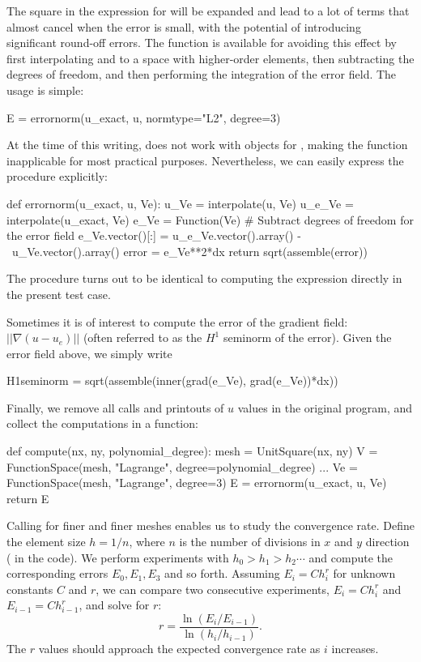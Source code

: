The square in the expression for  will be expanded and lead
to a lot of terms that almost cancel when the error is small, with the
potential of introducing significant round-off errors.  The function
 is available for avoiding this effect by first
interpolating  and  to a space with higher-order
elements, then subtracting the degrees of freedom, and then performing
the integration of the error field. The usage is simple:
\begin{python}
  E = errornorm(u_exact, u, normtype="L2", degree=3)
\end{python}
At the time of this writing,  does not work with
 objects for , making the function
inapplicable for most practical purposes. Nevertheless, we can easily
express the procedure explicitly:
\begin{python}
def errornorm(u_exact, u, Ve):
    u_Ve = interpolate(u, Ve)
    u_e_Ve = interpolate(u_exact, Ve)
    e_Ve = Function(Ve)
    # Subtract degrees of freedom for the error field
    e_Ve.vector()[:] = u_e_Ve.vector().array() - \
                       u_Ve.vector().array()
    error = e_Ve**2*dx
    return sqrt(assemble(error))
\end{python}
The  procedure turns out to be identical to computing
the expression \emp{(u\_e - u)**2*dx} directly in the present test case.

Sometimes it is of interest to compute the error of the gradient field:
$||\nabla (u-u_e)||$ (often referred to as the $H^1$ seminorm of the
error).  Given the error field \emp{e\_Ve} above, we simply write
\begin{python}
  H1seminorm = sqrt(assemble(inner(grad(e_Ve), grad(e_Ve))*dx))
\end{python}

Finally, we remove all  calls and printouts of $u$ values in
the original program, and collect the computations in a function:
\begin{python}
def compute(nx, ny, polynomial_degree):
    mesh = UnitSquare(nx, ny)
    V = FunctionSpace(mesh, "Lagrange", degree=polynomial_degree)
    ...
    Ve = FunctionSpace(mesh, "Lagrange", degree=3)
    E = errornorm(u_exact, u, Ve)
    return E
\end{python}

Calling  for finer and finer meshes enables us to study
the convergence rate. Define the element size $h=1/n$, where $n$ is the
number of divisions in $x$ and $y$ direction (\emp{nx=ny} in the code). We
perform experiments with $h_0>h_1>h_2\cdots$ and compute the corresponding
errors $E_0, E_1, E_3$ and so forth.  Assuming $E_i=Ch_i^r$ for unknown
constants $C$ and $r$, we can compare two consecutive experiments,
$E_i=Ch_i^r$ and $E_{i-1}=Ch_{i-1}^r$, and solve for $r$:
\begin{equation}
  r = \frac{\ln(E_i/E_{i-1})}{\ln (h_i/h_{i-1})}.
\end{equation}
The $r$ values should approach the expected convergence rate
 as $i$ increases.

